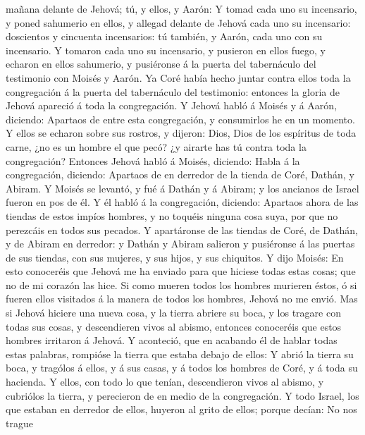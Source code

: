 mañana delante de Jehová; tú, y ellos, y Aarón:  Y tomad
cada uno su incensario, y poned sahumerio en ellos, y allegad delante de
Jehová cada uno su incensario: doscientos y cincuenta incensarios: tú
también, y Aarón, cada uno con su incensario.  Y tomaron
cada uno su incensario, y pusieron en ellos fuego, y echaron en ellos
sahumerio, y pusiéronse á la puerta del tabernáculo del testimonio con
Moisés y Aarón.  Ya Coré había hecho juntar contra ellos
toda la congregación á la puerta del tabernáculo del testimonio:
entonces la gloria de Jehová apareció á toda la congregación.
 Y Jehová habló á Moisés y á Aarón, diciendo:
 Apartaos de entre esta congregación, y consumirlos he en
un momento.  Y ellos se echaron sobre sus rostros, y
dijeron: Dios, Dios de los espíritus de toda carne, ¿no es un hombre el
que pecó? ¿y airarte has tú contra toda la congregación? 
Entonces Jehová habló á Moisés, diciendo:  Habla á la
congregación, diciendo: Apartaos de en derredor de la tienda de Coré,
Dathán, y Abiram.  Y Moisés se levantó, y fué á Dathán y
á Abiram; y los ancianos de Israel fueron en pos de él. 
Y él habló á la congregación, diciendo: Apartaos ahora de las tiendas de
estos impíos hombres, y no toquéis ninguna cosa suya, por que no
perezcáis en todos sus pecados.  Y apartáronse de las
tiendas de Coré, de Dathán, y de Abiram en derredor: y Dathán y Abiram
salieron y pusiéronse á las puertas de sus tiendas, con sus mujeres, y
sus hijos, y sus chiquitos.  Y dijo Moisés: En esto
conoceréis que Jehová me ha enviado para que hiciese todas estas cosas;
que no de mi corazón las hice.  Si como mueren todos los
hombres murieren éstos, ó si fueren ellos visitados á la manera de todos
los hombres, Jehová no me envió.  Mas si Jehová hiciere
una nueva cosa, y la tierra abriere su boca, y los tragare con todas sus
cosas, y descendieren vivos al abismo, entonces conoceréis que estos
hombres irritaron á Jehová.  Y aconteció, que en acabando
él de hablar todas estas palabras, rompióse la tierra que estaba debajo
de ellos:  Y abrió la tierra su boca, y tragólos á ellos,
y á sus casas, y á todos los hombres de Coré, y á toda su hacienda.
 Y ellos, con todo lo que tenían, descendieron vivos al
abismo, y cubriólos la tierra, y perecieron de en medio de la
congregación.  Y todo Israel, los que estaban en derredor
de ellos, huyeron al grito de ellos; porque decían: No nos trague
